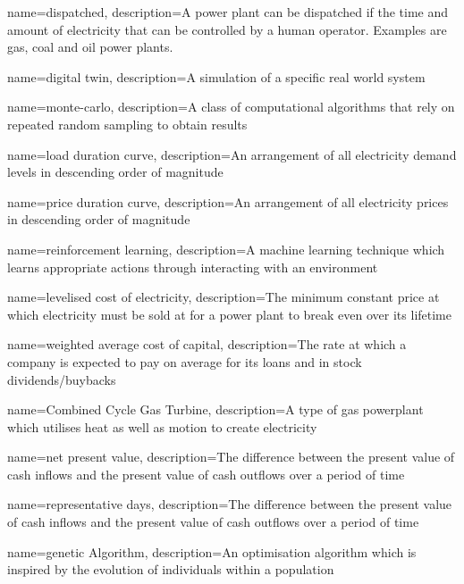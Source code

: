 {
	name=dispatched,
	description={A power plant can be dispatched if the time and amount of electricity that can be controlled by a human operator. Examples are gas, coal and oil power plants.}
}

{
	name=digital twin,
	description={A simulation of a specific real world system}
}


{
	name=monte-carlo,
	description={A class of computational algorithms that rely on repeated random sampling to obtain results}
}



{
	name=load duration curve,
	description={An arrangement of all electricity demand levels in descending order of magnitude}
}




{
	name=price duration curve,
	description={An arrangement of all electricity prices in descending order of magnitude}
}


{
	name=reinforcement learning,
	description={A machine learning technique which learns appropriate actions through interacting with an environment}
}



{
	name=levelised cost of electricity,
	description={The minimum constant price at which electricity must be sold at for a power plant to break even over its lifetime}
}



{
	name=weighted average cost of capital,
	description={The rate at which a company is expected to pay on average for its loans and in stock dividends/buybacks}
}


{
	name=Combined Cycle Gas Turbine,
	description={A type of gas powerplant which utilises heat as well as motion to create electricity}
}



{
	name=net present value,
	description={The difference between the present value of cash inflows and the present value of cash outflows over a period of time}
}


{
	name=representative days,
	description={The difference between the present value of cash inflows and the present value of cash outflows over a period of time}
}


{
	name=genetic Algorithm,
	description={An optimisation algorithm which is inspired by the evolution of individuals within a population}
}



